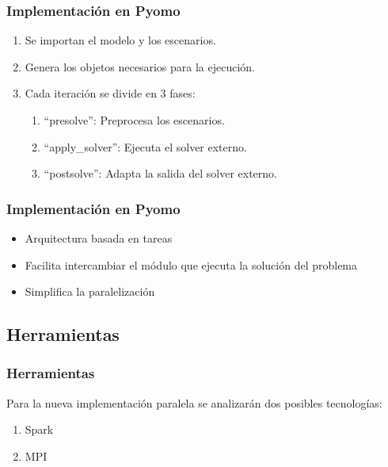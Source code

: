 \documentclass{beamer}
\begin{document}
\begin{frame}
    \frametitle{Implementación en Pyomo}
    \begin{enumerate}
        \item Se importan el modelo y los escenarios.
        \item Genera los objetos necesarios para la ejecución.
        \item Cada iteración se divide en 3 fases:
        \begin{enumerate}
            \item ``presolve'': Preprocesa los escenarios.
            \item ``apply\_solver'': Ejecuta el solver externo.
            \item ``postsolve'': Adapta la salida del solver externo.
        \end{enumerate}
    \end{enumerate}
\end{frame}

\begin{frame}
    \frametitle{Implementación en Pyomo}
    \begin{itemize}
        \item Arquitectura basada en tareas
        \item Facilita intercambiar el módulo que ejecuta la solución del problema
        \item Simplifica la paralelización
    \end{itemize}
\end{frame}

\subsection{Herramientas}

\begin{frame}{}
    \frametitle{Herramientas}
    Para la nueva implementación paralela se analizarán dos posibles tecnologías:
    \begin{enumerate}
        \item Spark
        \item MPI
    \end{enumerate}
\end{frame}
\end{document}
